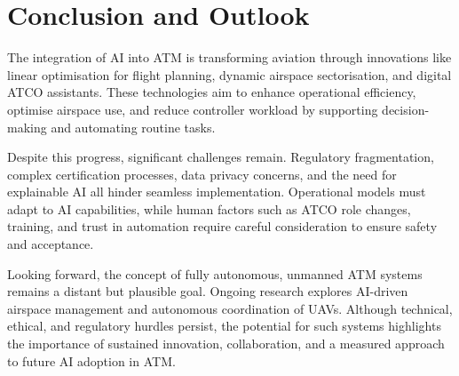 \section{Conclusion and Outlook}




The integration of \gls{AI} into \gls{ATM} is transforming aviation through innovations like linear optimisation for flight planning, dynamic airspace sectorisation, and digital \gls{ATCO} assistants. 
These technologies aim to enhance operational efficiency, optimise airspace use, and reduce controller workload by supporting decision-making and automating routine tasks.

Despite this progress, significant challenges remain. 
Regulatory fragmentation, complex certification processes, data privacy concerns, and the need for explainable \gls{AI} all hinder seamless implementation. 
Operational models must adapt to \gls{AI} capabilities, while human factors such as \gls{ATCO} role changes, training, and trust in automation require careful consideration to ensure safety and acceptance.

Looking forward, the concept of fully autonomous, unmanned \gls{ATM} systems remains a distant but plausible goal. 
Ongoing research explores \gls{AI}-driven airspace management and autonomous coordination of \glspl{UAV}. 
Although technical, ethical, and regulatory hurdles persist, the potential for such systems highlights the importance of sustained innovation, collaboration, and a measured approach to future \gls{AI} adoption in \gls{ATM}.